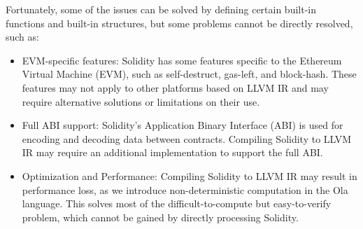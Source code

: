 Fortunately, some of the issues can be solved by defining certain built-in functions and built-in structures, but some problems cannot be directly resolved, such as:

\begin{itemize}
    \item EVM-specific features: Solidity has some features specific to the Ethereum Virtual Machine (EVM), such as self-destruct, gas-left, and block-hash. These features may not apply to other platforms based on LLVM IR and may require alternative solutions or limitations on their use.

    \item Full ABI support: Solidity's Application Binary Interface (ABI) is used for encoding and decoding data between contracts. Compiling Solidity to LLVM IR may require an additional implementation to support the full ABI.

    \item Optimization and Performance: Compiling Solidity to LLVM IR may result in performance loss, as we introduce non-deterministic computation in the Ola language. This solves most of the difficult-to-compute but easy-to-verify problem, which cannot be gained by directly processing Solidity.

\end{itemize}
